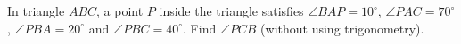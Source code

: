 In triangle $ABC$, a point $P$ inside the triangle satisfies $\angle BAP=10^\circ$, $\angle PAC=70^\circ$, $\angle PBA=20^\circ$ and $\angle PBC=40^\circ$. Find $\angle PCB$ (without using trigonometry).
